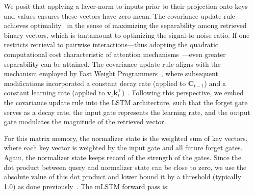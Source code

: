 We posit that applying a layer-norm to inputs prior to their projection onto keys and values ensures these vectors have zero mean. The covariance update rule achieves optimality~\citep{Dayan:91} in the sense of maximizing the separability among retrieved binary vectors, which is tantamount to optimizing the signal-to-noise ratio. If one restricts retrieval to pairwise interactions—thus adopting the quadratic computational cost characteristic of attention mechanisms~\citep{Krotov:16,Krotov:17,Ramsauer:21}—even greater separability can be attained. The covariance update rule aligns with the mechanism employed by Fast Weight Programmers~\citep{Schmidhuber:92ncfastweights,Schlag:21}, where subsequent modifications incorporated a constant decay rate (applied to $\mathbf{C}_{t-1}$) and a constant learning rate (applied to $\mathbf{v}_{t} \mathbf{k}_t ^\top$)~\citep{Ba:16}. Following this perspective, we embed the covariance update rule into the LSTM architecture, such that the forget gate serves as a decay rate, the input gate represents the learning rate, and the output gate modulates the magnitude of the retrieved vector.

For this matrix memory, the normalizer state is the weighted sum of key vectors, where each key vector is weighted by the input gate and all future forget gates. Again, the normalizer state keeps record of the strength of the gates. Since the dot product between query and normalizer state can be close to zero, we use the absolute value of this dot product and lower bound it by a threshold (typically 1.0) as done previously~\citep{Sun:23arxiv}. The mLSTM forward pass is:

